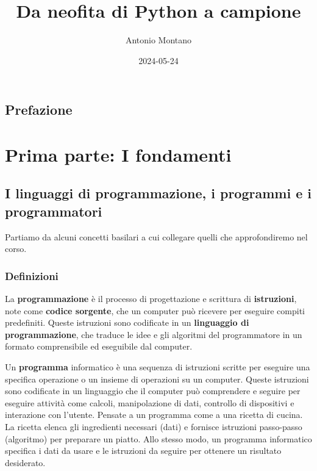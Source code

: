 \documentclass[
  letterpaper,
  DIV=11,
  numbers=noendperiod]{scrreprt}
\title{Da neofita di Python a campione}
\author{Antonio Montano}
\date{2024-05-24}
\renewcommand*\contentsname{Indice}
\newcommand\contentsname{Indice}
\begin{document}
\maketitle

\renewcommand*\contentsname{Indice}
{
\hypersetup{linkcolor=}
\setcounter{tocdepth}{2}
\tableofcontents
}

\chapter*{Prefazione}\label{prefazione}


\part{Prima parte: I fondamenti}

\chapter{I linguaggi di programmazione, i programmi e i
programmatori}\label{i-linguaggi-di-programmazione-i-programmi-e-i-programmatori}

Partiamo da alcuni concetti basilari a cui collegare quelli che
approfondiremo nel corso.

\section{Definizioni}\label{definizioni}

La \textbf{programmazione} è il processo di progettazione e scrittura di
\textbf{istruzioni}, note come \textbf{codice sorgente}, che un computer
può ricevere per eseguire compiti predefiniti. Queste istruzioni sono
codificate in un \textbf{linguaggio di programmazione}, che traduce le
idee e gli algoritmi del programmatore in un formato comprensibile ed
eseguibile dal computer.

Un \textbf{programma} informatico è una sequenza di istruzioni scritte
per eseguire una specifica operazione o un insieme di operazioni su un
computer. Queste istruzioni sono codificate in un linguaggio che il
computer può comprendere e seguire per eseguire attività come calcoli,
manipolazione di dati, controllo di dispositivi e interazione con
l'utente. Pensate a un programma come a una ricetta di cucina. La
ricetta elenca gli ingredienti necessari (dati) e fornisce istruzioni
passo-passo (algoritmo) per preparare un piatto. Allo stesso modo, un
programma informatico specifica i dati da usare e le istruzioni da
seguire per ottenere un risultato desiderato.
\end{document}
